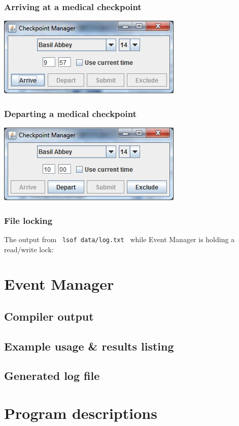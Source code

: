 \documentclass[a4paper, twoside]{article}
\begin{document}
\subsubsection{Arriving at a medical checkpoint}
\includegraphics{screenshot2.jpg}
\subsubsection{Departing a medical checkpoint}
\includegraphics{screenshot3.jpg}
\subsubsection{File locking}
The output from \verb+ lsof data/log.txt + while Event Manager is holding a
read/write lock:


\section{Event Manager}
\subsection{Compiler output}

\subsection{Example usage \& results listing}

\subsection{Generated log file}


\section{Program descriptions}
\end{document}

